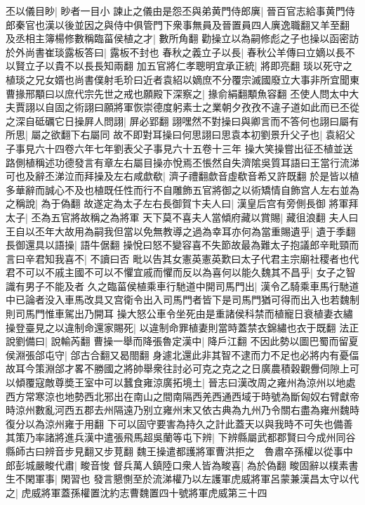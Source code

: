 丕以儀目眇|{
	眇者一目小}
諫止之儀由是怨丕與弟黄門侍郎廙|{
	晉百官志給事黄門侍郎秦官也漢以後並因之與侍中俱管門下衆事無員及晉置員四人廙逸職翻又羊至翻}
及丞相主簿楊修數稱臨菑侯植之才|{
	數所角翻}
勸操立以為嗣修彪之子也操以函密訪於外尚書崔琰露板答曰|{
	露板不封也}
春秋之義立子以長|{
	春秋公羊傳曰立嫡以長不以賢立子以貴不以長長知兩翻}
加五官將仁孝聰明宜承正統|{
	將即亮翻}
琰以死守之植琰之兄女婿也尚書僕射毛玠曰近者袁紹以嫡庶不分覆宗滅國廢立大事非所宜聞東曹掾邢顒曰以庶代宗先世之戒也願殿下深察之|{
	掾俞絹翻顒魚容翻}
丕使人問太中大夫賈詡以自固之術詡曰願將軍恢崇德度躬素士之業朝夕孜孜不違子道如此而已丕從之深自砥礪它日操屛人問詡|{
	屏必郢翻}
詡嘿然不對操曰與卿言而不答何也詡曰屬有所思|{
	屬之欲翻下右屬同}
故不即對耳操曰何思詡曰思袁本初劉景升父子也|{
	袁紹父子事見六十四卷六年七年劉表父子事見六十五卷十三年}
操大笑操嘗出征丕植並送路側植稱述功德發言有章左右屬目操亦悅焉丕悵然自失濟隂吳質耳語曰王當行流涕可也及辭丕涕泣而拜操及左右咸歔欷|{
	濟子禮翻歔音虛欷音希又許既翻}
於是皆以植多華辭而誠心不及也植既任性而行不自雕飾五官將御之以術矯情自飾宫人左右並為之稱說|{
	為于偽翻}
故遂定為太子左右長御賀卞夫人曰|{
	漢皇后宫有旁側長御}
將軍拜太子|{
	丕為五官將故稱之為將軍}
天下莫不喜夫人當傾府藏以賞賜|{
	藏徂浪翻}
夫人曰王自以丕年大故用為嗣我但當以免無教導之過為幸耳亦何為當重賜遺乎|{
	遺于季翻}
長御還具以語操|{
	語牛倨翻}
操悅曰怒不變容喜不失節故最為難太子抱議郎辛毗頸而言曰辛君知我喜不|{
	不讀曰否}
毗以告其女憲英憲英歎曰太子代君主宗廟社稷者也代君不可以不戚主國不可以不懼宜戚而懼而反以為喜何以能久魏其不昌乎|{
	女子之智識有男子不能及者}
久之臨菑侯植乘車行馳道中開司馬門出|{
	漢令乙騎乘車馬行馳道中已論者没入車馬改具又宫衛令出入司馬門者皆下是司馬門猶可得而出入也若魏制則司馬門惟車駕出乃開耳}
操大怒公車令坐死由是重諸侯科禁而植寵日衰植妻衣繡操登臺見之以違制命還家賜死|{
	以違制命罪植妻則當時蓋禁衣錦繡也衣于既翻}
法正說劉備曰|{
	說輸芮翻}
曹操一舉而降張魯定漢中|{
	降戶江翻}
不因此勢以圖巴蜀而留夏侯淵張郃屯守|{
	郃古合翻又曷閤翻}
身遽北還此非其智不逮而力不足也必將内有憂偪故耳今策淵郃才畧不勝國之將帥舉衆往討必可克之克之之日廣農積穀觀釁伺隙上可以傾覆寇敵尊奬王室中可以蠶食雍涼廣拓境土|{
	晉志曰漢改周之雍州為涼州以地處西方常寒涼也地勢西北邪出在南山之間南隔西羌西通西域于時號為斷匈奴右臂獻帝時涼州數亂河西五郡去州隔遠乃别立雍州末又依古典為九州乃令關右盡為雍州魏時復分以為涼州雍于用翻}
下可以固守要害為持久之計此蓋天以與我時不可失也備善其策乃率諸將進兵漢中遣張飛馬超吳蘭等屯下辨|{
	下辨縣屬武都郡賢曰今成州同谷縣師古曰辨音步見翻又步莧翻}
魏王操遣都護將軍曹洪拒之　魯肅卒孫權以從事中郎彭城嚴畯代肅|{
	畯音悛}
督兵萬人鎮陸口衆人皆為畯喜|{
	為於偽翻}
畯固辭以樸素書生不閑軍事|{
	閑習也}
發言懇惻至於流涕權乃以左護軍虎威將軍呂蒙兼漢昌太守以代之|{
	虎威將軍蓋孫權置沈約志曹魏置四十號將軍虎威第三十四}
